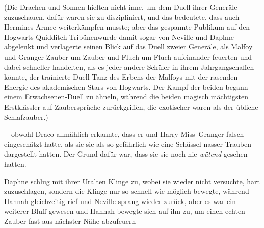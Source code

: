 (Die Drachen und Sonnen hielten nicht inne, um dem Duell ihrer Generäle zuzuschauen, dafür waren sie zu diszipliniert, und das bedeutete, dass auch Hermines Armee weiterkämpfen musste; aber das gespannte Publikum auf den Hogwarts Quidditch-Tribünenwurde damit sogar von Neville und Daphne abgelenkt und verlagerte seinen Blick auf das Duell zweier Generäle, als Malfoy und Granger Zauber um Zauber und Fluch um Fluch aufeinander feuerten und dabei schneller handelten, als es jeder andere Schüler in ihrem Jahrgangschaffen könnte, der trainierte Duell-Tanz des Erbens der Malfoys mit der rasenden Energie des akademischen Stars von Hogwarts. Der Kampf der beiden begann einem Erwachsenen-Duell zu ähneln, während die beiden magisch mächtigsten Erstklässler auf Zaubersprüche zurückgriffen, die exotischer waren als der übliche Schlafzauber.)

—obwohl Draco allmählich erkannte, dass er und Harry Miss~Granger falsch eingeschätzt hatte, als sie sie als so gefährlich wie eine Schüssel nasser Trauben dargestellt hatten. Der Grund dafür war, dass sie sie noch nie \emph{wütend} gesehen hatten.

\later

Daphne schlug mit ihrer Uralten Klinge zu, wobei sie wieder nicht versuchte, hart zuzuschlagen, sondern die Klinge nur so schnell wie möglich bewegte, während Hannah gleichzeitig  rief und Neville sprang wieder zurück, aber es war ein weiterer Bluff gewesen und Hannah bewegte sich auf ihn zu, um einen echten Zauber fast aus nächster Nähe abzufeuern—

